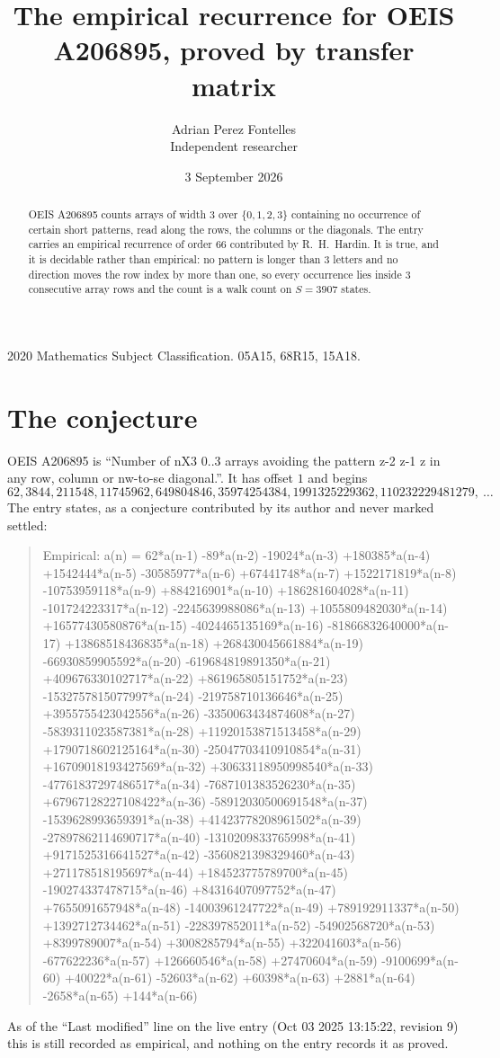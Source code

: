 \documentclass[11pt,a4paper]{article}
\title{The empirical recurrence for OEIS A206895, proved by transfer matrix}
\author{Adrian Perez Fontelles\\ \small Independent researcher}
\date{3 September 2026}
\theoremstyle{plain}
\theoremstyle{definition}
\begin{document}
\maketitle

\begin{abstract}
OEIS A206895 counts arrays of width $3$ over $\{0,1,2,3\}$ containing no occurrence of certain short
patterns, read along the rows, the columns or the diagonals. The entry carries an empirical
recurrence of order $66$ contributed by R.~H.~Hardin. It is true, and it is decidable
rather than empirical: no pattern is longer than $3$ letters and no direction moves the row
index by more than one, so every occurrence lies inside $3$ consecutive array rows and the
count is a walk count on $S=3907$ states.
\end{abstract}

\noindent\small 2020 Mathematics Subject Classification. 05A15, 68R15, 15A18.\normalsize

\section{The conjecture}

OEIS A206895 is ``Number of nX3 0..3 arrays avoiding the pattern z-2 z-1 z in any row, column or nw-to-se diagonal.''. It has offset $1$ and begins
\[
62, 3844, 211548, 11745962, 649804846, 35974254384, 1991325229362, 110232229481279,\ \dots
\]
The entry states, as a conjecture contributed by its author and never marked settled:
\begin{quote}
Empirical: a(n) = 62*a(n-1) -89*a(n-2) -19024*a(n-3) +180385*a(n-4) +1542444*a(n-5) -30585977*a(n-6) +67441748*a(n-7) +1522171819*a(n-8) -10753959118*a(n-9) +884216901*a(n-10) +186281604028*a(n-11) -101724223317*a(n-12) -2245639988086*a(n-13) +1055809482030*a(n-14) +16577430580876*a(n-15) -4024465135169*a(n-16) -81866832640000*a(n-17) +13868518436835*a(n-18) +268430045661884*a(n-19) -66930859905592*a(n-20) -619684819891350*a(n-21) +409676330102717*a(n-22) +861965805151752*a(n-23) -1532757815077997*a(n-24) -219758710136646*a(n-25) +3955755423042556*a(n-26) -3350063434874608*a(n-27) -5839311023587381*a(n-28) +11920153871513458*a(n-29) +1790718602125164*a(n-30) -25047703410910854*a(n-31) +16709018193427569*a(n-32) +30633118950998540*a(n-33) -47761837297486517*a(n-34) -7687101383526230*a(n-35) +67967128227108422*a(n-36) -58912030500691548*a(n-37) -1539628993659391*a(n-38) +41423778208961502*a(n-39) -27897862114690717*a(n-40) -1310209833765998*a(n-41) +9171525316641527*a(n-42) -3560821398329460*a(n-43) +271178518195697*a(n-44) +184523775789700*a(n-45) -190274337478715*a(n-46) +84316407097752*a(n-47) +7655091657948*a(n-48) -14003961247722*a(n-49) +789192911337*a(n-50) +1392712734462*a(n-51) -228397852011*a(n-52) -54902568720*a(n-53) +8399789007*a(n-54) +3008285794*a(n-55) +322041603*a(n-56) -677622236*a(n-57) +126660546*a(n-58) +27470604*a(n-59) -9100699*a(n-60) +40022*a(n-61) -52603*a(n-62) +60398*a(n-63) +2881*a(n-64) -2658*a(n-65) +144*a(n-66)
\end{quote}
As of the ``Last modified'' line on the live entry (Oct 03 2025 13:15:22, revision 9) this is still
recorded as empirical, and nothing on the entry records it as proved.
\end{document}
